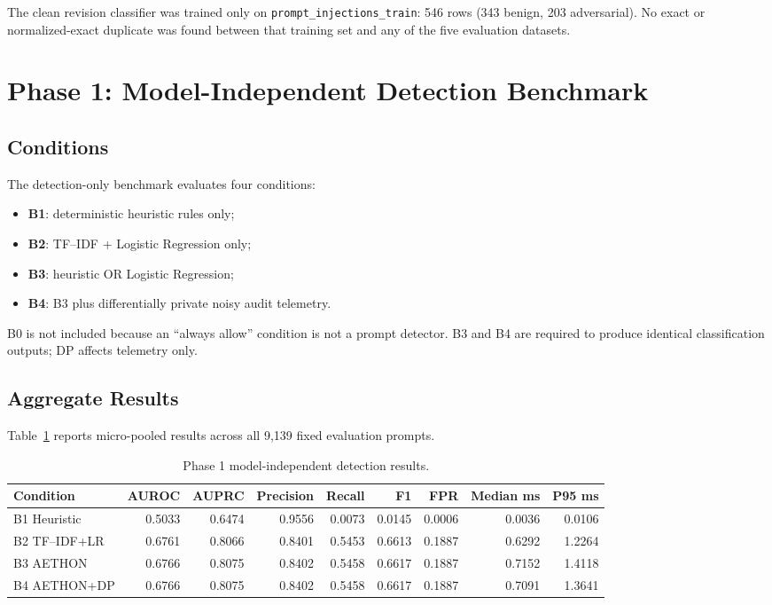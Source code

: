 \documentclass[11pt,a4paper]{article}
\begin{document}
The clean revision classifier was trained only on \texttt{prompt\_injections\_train}: 546 rows (343 benign, 203 adversarial). No exact or normalized-exact duplicate was found between that training set and any of the five evaluation datasets.

\section{Phase 1: Model-Independent Detection Benchmark}
\subsection{Conditions}
The detection-only benchmark evaluates four conditions:

\begin{itemize}[leftmargin=*]
  \item \textbf{B1}: deterministic heuristic rules only;
  \item \textbf{B2}: TF--IDF + Logistic Regression only;
  \item \textbf{B3}: heuristic OR Logistic Regression;
  \item \textbf{B4}: B3 plus differentially private noisy audit telemetry.
\end{itemize}

B0 is not included because an ``always allow'' condition is not a prompt detector. B3 and B4 are required to produce identical classification outputs; DP affects telemetry only.

\subsection{Aggregate Results}
Table~\ref{tab:phase1} reports micro-pooled results across all 9,139 fixed evaluation prompts.

\begin{table}[H]
\centering
\caption{Phase 1 model-independent detection results.}
\label{tab:phase1}
\begin{tabular}{lrrrrrrrr}
\toprule
Condition & AUROC & AUPRC & Precision & Recall & F1 & FPR & Median ms & P95 ms \\
\midrule
B1 Heuristic & 0.5033 & 0.6474 & 0.9556 & 0.0073 & 0.0145 & 0.0006 & 0.0036 & 0.0106 \\
B2 TF--IDF+LR & 0.6761 & 0.8066 & 0.8401 & 0.5453 & 0.6613 & 0.1887 & 0.6292 & 1.2264 \\
B3 AETHON & 0.6766 & 0.8075 & 0.8402 & 0.5458 & 0.6617 & 0.1887 & 0.7152 & 1.4118 \\
B4 AETHON+DP & 0.6766 & 0.8075 & 0.8402 & 0.5458 & 0.6617 & 0.1887 & 0.7091 & 1.3641 \\
\bottomrule
\end{tabular}
\end{table}
\end{document}

